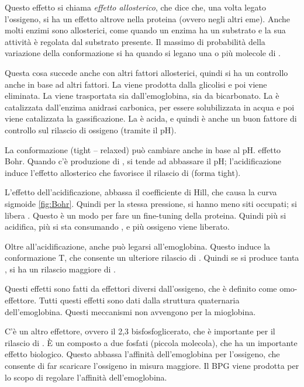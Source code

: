 Questo effetto si chiama \emph{effetto allosterico}, che dice che, una volta legato
l'ossigeno, si ha un effetto altrove nella proteina (ovvero negli altri
eme). Anche molti enzimi sono allosterici, come quando un enzima ha un
substrato e la sua attività è regolata dal substrato presente.
Il massimo di probabilità della variazione della conformazione si ha
quando si legano una o più molecole di .

Questa cosa succede anche con altri fattori allosterici, quindi si ha un
controllo anche in base ad altri fattori.
La  viene prodotta dalla glicolisi e poi viene eliminata. La
 viene trasportata sia dall'emoglobina, sia da bicarbonato.
La  è catalizzata dall'enzima anidrasi carbonica, per essere
solubilizzata in acqua e poi viene catalizzata la gassificazione.
La  è acida, e quindi è anche un buon fattore di controllo sul
rilascio di ossigeno (tramite il pH).

La conformazione (tight -- relaxed) può cambiare anche in base al pH.
effetto Bohr.
Quando c'è produzione di , si tende ad abbassare il pH;
l'acidificazione induce l'effetto allosterico che favorisce il rilascio
di  (forma tight).


L'effetto dell'acidificazione, abbassa il coefficiente di Hill, che
causa la curva sigmoide {}\ref{fig:Bohr}. Quindi per la stessa pressione, si hanno
meno siti occupati; si libera .
Questo è un modo per fare un fine-tuning della proteina.
Quindi più si acidifica, più si sta consumando , e più ossigeno viene
liberato.

Oltre all'acidificazione, anche  può legarsi all'emoglobina.
Questo induce la conformazione T, che consente un ulteriore rilascio di
.
Quindi se si produce tanta , si ha un rilascio maggiore di
.

Questi effetti sono fatti da effettori diversi dall'ossigeno, che è
definito come omo-effettore. Tutti questi effetti sono dati dalla
struttura quaternaria dell'emoglobina.
Questi meccanismi non avvengono per la mioglobina.

\vfill
\pagebreak

C'è un altro effettore, ovvero il 2,3 bisfosfoglicerato, che è importante per il rilascio di
. È un composto a due fosfati (piccola molecola), che ha un
importante effetto biologico.
Questo abbassa l'affinità dell'emoglobina per l'ossigeno, che consente
di far scaricare l'ossigeno in misura maggiore.
Il BPG viene prodotta per lo scopo di regolare l'affinità
dell'emoglobina.

